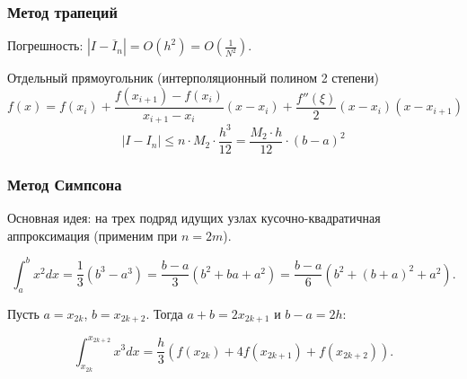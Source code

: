 \documentclass[10pt]{beamer}
\begin{document}
\begin{frame}[fragile]
\frametitle{Метод трапеций}


Погрешность: $|I - \overline{I}_n| = O(h^2) = O \left(\frac{1}{N^2} \right)$.

\vfill 

Отдельный прямоугольник (интерполяционный полином 2 степени)
$$ f(x) = f(x_i) + \frac{f(x_{i+1}) - f(x_i)}{x_{i+1} - x_i} (x - x_i) + \frac{f''(\xi)}{2} (x - x_i)(x - x_{i+1})$$
$$ \left|I - I_n \right| \leqslant n \cdot M_2 \cdot \frac{h^3}{12} = \frac{M_2 \cdot h}{12} \cdot (b-a)^2$$

\end{frame}

\begin{frame}[fragile]
\frametitle{Метод Симпсона}

Основная идея: на трех подряд идущих узлах кусочно-квадратичная аппроксимация (применим при $n = 2 m$).


$$\int_{a}^{b} x^2 dx = \frac{1}{3} (b^3 - a^3) = \frac{b-a}{3} (b^2 + ba + a^2) = \frac{b-a}{6} \left(b^2 + (b+a)^2 + a^2 \right).$$

Пусть $a = x_{2k}$, $b = x_{2k+2}$. Тогда $a+b = 2 x_{2k+1}$ и $b-a=2h$:

$$\int_{x_{2k}}^{x_{2k+2}} x^3 dx = \frac{h}{3} \left(f(x_{2k}) + 4 f(x_{2k+1}) + f(x_{2k+2}) \right).$$
\end{frame}
\end{document}
